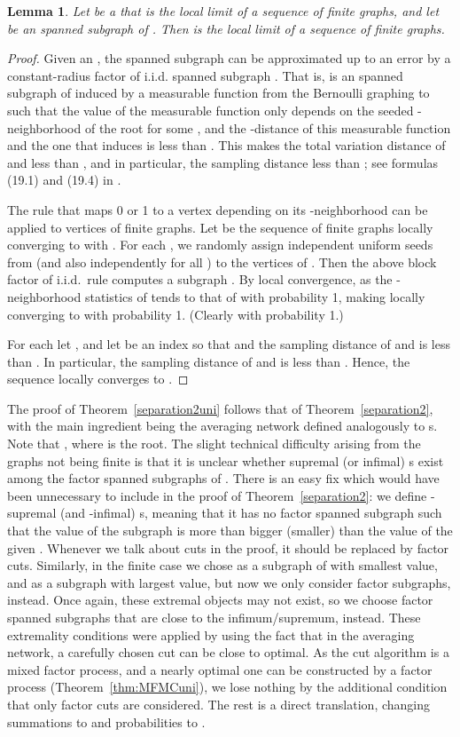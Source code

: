 \documentclass[12pt,a4paper]{article}
\newtheorem{Lemma}[Theorem]{Lemma}
\renewcommand{\:}{\colon}
\begin{document}
\begin{Lemma}
Let  be a  that is the local limit of a sequence of finite graphs, and let  be an  spanned subgraph of . 
Then  is the local limit of a sequence of finite graphs. 
\end{Lemma}
\begin{proof}
Given an , the  spanned subgraph  can be approximated up to an error  by a constant-radius factor of i.i.d. spanned subgraph . 
That is,  is an  spanned subgraph of  induced by a measurable function from the Bernoulli graphing to  such that the value of the measurable function only depends on the seeded -neighborhood of the root for some , and the -distance of this measurable function and the one that induces  is less than . 
This makes the total variation distance of  and  less than , and in particular, the sampling distance less than ; see formulas (19.1) and (19.4) in \cite{Lovaszbook}. 

The rule that maps 0 or 1 to a vertex depending on its -neighborhood can be applied to vertices of finite graphs. 
Let  be the sequence of finite graphs locally converging to  with . 
For each , we randomly assign independent uniform seeds from  (and also independently for all ) to the vertices of . 
Then the above block factor of i.i.d.\ rule computes a subgraph . 
By local convergence, as  the -neighborhood statistics of  tends to that of  with probability 1, making  locally converging to  with probability 1. 
(Clearly  with probability 1.)

For each  let , and let  be an index so that  and the sampling distance of  and  is less than . 
In particular, the sampling distance of  and  is less than . 
Hence, the sequence  locally converges to .  
\end{proof}

The proof of Theorem~\ref{separation2uni} follows that of Theorem~\ref{separation2}, with the main ingredient being the averaging network  defined analogously to s. 
Note that , where  is the root. 
The slight technical difficulty arising from the graphs not being finite is that it is unclear whether supremal (or infimal) s exist among the factor spanned subgraphs of . 
There is an easy fix which would have been unnecessary to include in the proof of Theorem~\ref{separation2}: we define -supremal (and -infimal) s, meaning that it has no factor spanned subgraph such that the  value of the subgraph is more than  bigger (smaller) than the  value of the given . 
Whenever we talk about cuts in the proof, it should be replaced by factor cuts. 
Similarly, in the finite case we chose  as a subgraph of  with smallest  value, and  as a subgraph with largest  value, but now we only consider factor subgraphs, instead. 
Once again, these extremal objects may not exist, so we choose factor spanned subgraphs that are close to the infimum/supremum, instead. 
These extremality conditions were applied by using the fact that in the averaging network, a carefully chosen cut can be close to optimal. 
As the cut algorithm is a mixed factor process, and a nearly optimal one can be constructed by a factor process (Theorem~\ref{thm:MFMCuni}), we lose nothing by the additional condition that only factor cuts are considered. 
The rest is a direct translation, changing summations to  and probabilities to . 
\end{document}
